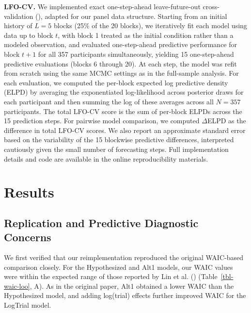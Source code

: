 \documentclass[
  man,
  floatsintext,
  longtable,
  nolmodern,
  notxfonts,
  notimes,
  colorlinks=true,linkcolor=blue,citecolor=blue,urlcolor=blue]{apa7}
\begin{document}
\textbf{LFO-CV.} We implemented exact one-step-ahead leave-future-out
cross-validation (), adapted for our panel data structure. Starting from an initial
history of \(L = 5\) blocks (25\% of the 20 blocks), we iteratively fit
each model using data up to block \(t\), with block 1 treated as the
initial condition rather than a modeled observation, and evaluated
one-step-ahead predictive performance for block \(t + 1\) for all 357
participants simultaneously, yielding 15 one-step-ahead predictive
evaluations (blocks 6 through 20). At each step, the model was refit
from scratch using the same MCMC settings as in the full-sample
analysis. For each evaluation, we computed the per-block expected log
predictive density (ELPD) by averaging the exponentiated log-likelihood
across posterior draws for each participant and then summing the log of
these averages across all \(N = 357\) participants. The total LFO-CV
score is the sum of per-block ELPDs across the 15 prediction steps. For
pairwise model comparison, we computed \(\Delta\)ELPD as the difference
in total LFO-CV scores. We also report an approximate standard error
based on the variability of the 15 blockwise predictive differences,
interpreted cautiously given the small number of forecasting steps. Full
implementation details and code are available in the online
reproducibility materials.

\section{Results}\label{results}

\subsection{Replication and Predictive Diagnostic
Concerns}\label{replication-and-predictive-diagnostic-concerns}

We first verified that our reimplementation reproduced the original
WAIC-based comparison closely. For the Hypothesized and Alt1 models, our
WAIC values were within the expected range of those reported by Lin et
al. () (Table~\ref{tbl-waic-loo}, A).
As in the original paper, Alt1 obtained a lower WAIC than the
Hypothesized model, and adding log(trial) effects further improved WAIC
for the LogTrial model.
\end{document}
